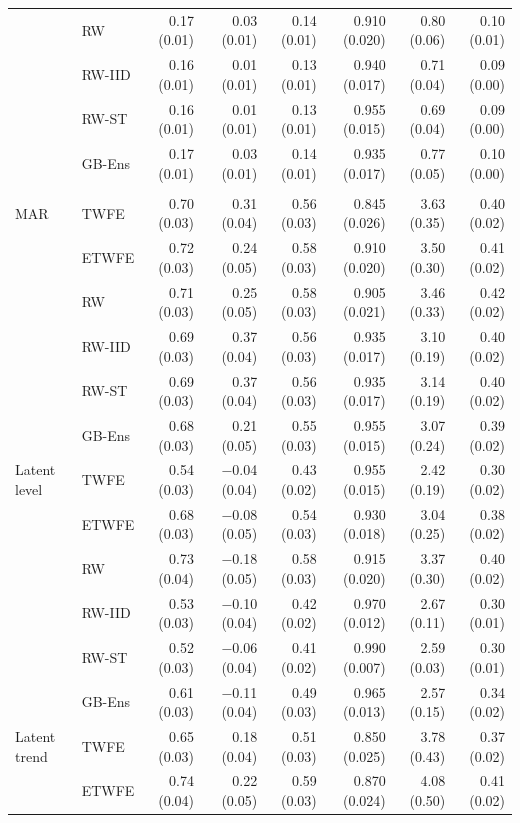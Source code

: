 \begin{table}
\begin{tabular*}{1\linewidth}{@{\extracolsep{\fill}}llrrrrrr}
 & RW & 0.17 (0.01) & 0.03 (0.01) & 0.14 (0.01) & 0.910 (0.020) & 0.80 (0.06) & 0.10 (0.01) \\ 
 & RW-IID & 0.16 (0.01) & 0.01 (0.01) & 0.13 (0.01) & 0.940 (0.017) & 0.71 (0.04) & 0.09 (0.00) \\ 
 & RW-ST & 0.16 (0.01) & 0.01 (0.01) & 0.13 (0.01) & 0.955 (0.015) & 0.69 (0.04) & 0.09 (0.00) \\ 
 & GB-Ens & 0.17 (0.01) & 0.03 (0.01) & 0.14 (0.01) & 0.935 (0.017) & 0.77 (0.05) & 0.10 (0.00) \\ 
\midrule\addlinespace[2.5pt]
\multicolumn{8}{l}{With covariates, event year 4} \\[2.5pt] 
\midrule\addlinespace[2.5pt]
MAR & TWFE & 0.70 (0.03) & 0.31 (0.04) & 0.56 (0.03) & 0.845 (0.026) & 3.63 (0.35) & 0.40 (0.02) \\ 
 & ETWFE & 0.72 (0.03) & 0.24 (0.05) & 0.58 (0.03) & 0.910 (0.020) & 3.50 (0.30) & 0.41 (0.02) \\ 
 & RW & 0.71 (0.03) & 0.25 (0.05) & 0.58 (0.03) & 0.905 (0.021) & 3.46 (0.33) & 0.42 (0.02) \\ 
 & RW-IID & 0.69 (0.03) & 0.37 (0.04) & 0.56 (0.03) & 0.935 (0.017) & 3.10 (0.19) & 0.40 (0.02) \\ 
 & RW-ST & 0.69 (0.03) & 0.37 (0.04) & 0.56 (0.03) & 0.935 (0.017) & 3.14 (0.19) & 0.40 (0.02) \\ 
 & GB-Ens & 0.68 (0.03) & 0.21 (0.05) & 0.55 (0.03) & 0.955 (0.015) & 3.07 (0.24) & 0.39 (0.02) \\ 
Latent level & TWFE & 0.54 (0.03) & −0.04 (0.04) & 0.43 (0.02) & 0.955 (0.015) & 2.42 (0.19) & 0.30 (0.02) \\ 
 & ETWFE & 0.68 (0.03) & −0.08 (0.05) & 0.54 (0.03) & 0.930 (0.018) & 3.04 (0.25) & 0.38 (0.02) \\ 
 & RW & 0.73 (0.04) & −0.18 (0.05) & 0.58 (0.03) & 0.915 (0.020) & 3.37 (0.30) & 0.40 (0.02) \\ 
 & RW-IID & 0.53 (0.03) & −0.10 (0.04) & 0.42 (0.02) & 0.970 (0.012) & 2.67 (0.11) & 0.30 (0.01) \\ 
 & RW-ST & 0.52 (0.03) & −0.06 (0.04) & 0.41 (0.02) & 0.990 (0.007) & 2.59 (0.03) & 0.30 (0.01) \\ 
 & GB-Ens & 0.61 (0.03) & −0.11 (0.04) & 0.49 (0.03) & 0.965 (0.013) & 2.57 (0.15) & 0.34 (0.02) \\ 
Latent trend & TWFE & 0.65 (0.03) & 0.18 (0.04) & 0.51 (0.03) & 0.850 (0.025) & 3.78 (0.43) & 0.37 (0.02) \\ 
 & ETWFE & 0.74 (0.04) & 0.22 (0.05) & 0.59 (0.03) & 0.870 (0.024) & 4.08 (0.50) & 0.41 (0.02) \\ 

\end{tabular*}
\end{table}
